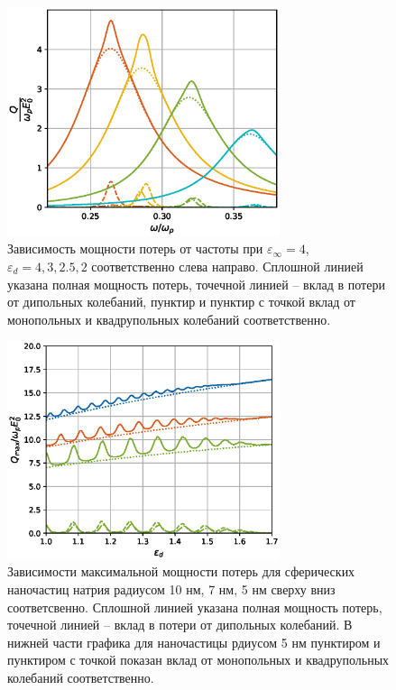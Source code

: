 \documentclass[12pt, a4paper]{article}
\def \eps {\varepsilon}
\begin{document}
\begin{figure}[h]
	\centering
	\includegraphics[width=80mm]{./image/fig1_epsd4.eps}
	\caption{Зависимость мощности потерь от частоты при $\eps_\infty= 4$, $\eps_d = 4, 3, 2.5, 2$ соответственно слева направо. Сплошной линией указана полная мощность потерь, точечной линией – вклад в потери от дипольных колебаний, пунктир и пунктир с точкой вклад от монопольных и квадрупольных колебаний соответственно. }
	\label{fig1_epsd4}
\end{figure} 
\newpage
\begin{figure}[h]
	\centering
	\includegraphics[width=80mm]{./image/natr2.eps}
	\caption{Зависимости максимальной мощности потерь для сферических наночастиц натрия радиусом 10 нм, 7 нм, 5 нм сверху вниз соответсвенно. Сплошной линией указана полная мощность потерь, точечной линией – вклад в потери от дипольных колебаний. В нижней части графика для наночастицы рдиусом 5 нм пунктиром и пунктиром с точкой показан вклад от монопольных и квадрупольных колебаний соответственно.}
	\label{natr}
\end{figure} 
\end{document}
